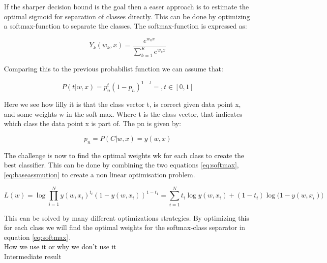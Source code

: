 If the sharper decision bound is the goal then a easer approach is to estimate the optimal sigmoid for separation of classes directly. This can be done by optimizing a softmax-function to separate the classes. The softmax-function is expressed as: 

\begin{equation}
\label{eq:softmax}
 Y_k(w_k,x)=\frac{e^{w_k x}}{\sum\limits_{k=1}^K e^{w_k x}}
\end{equation}

Comparing this to the previous probabilist function we can assume that:

\begin{equation}
\label{eq:baseassmution}
 P(t|w,x) = p_n^t (1-p_n)^{1-t} = , t \in [0,1] 
\end{equation}

Here we see how lilly it is that the class vector t, is correct given data point x, and some weights w in the soft-max.  Where t is the class vector, that indicates which class the data point x is part of.  The pn is given by: 

\begin{equation}
 p_n = P(C| w, x) = y(w,x)
\end{equation}

The challenge is now to find the optimal weights wk for each class to create the best classifier. This can be done by combining the two equations \ref{eq:softmax}, \ref{eq:baseassmution} to create a non linear optimisation problem.

\begin{equation}
 L(w) = \log{\prod\limits_{i=1}^N y(w,x_i)^{t_i} ( 1-y(w,x_i))^{1-t_1}}
 = \sum\limits_{i=1}^N t_i\log{y(w,x_i)}+(1-t_i)\log({1-y(w,x_i))}
\end{equation}

This can be solved by many different optimizations strategies. By optimizing this for each class we will find the optimal weights for the softmax-class separator in equation \ref{eq:softmax}.\\


How we use it or why we don't use it\\

Intermediate result\\


